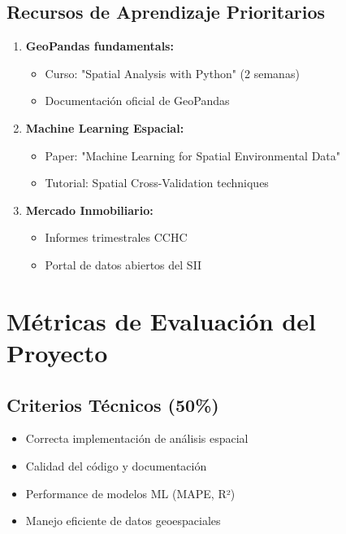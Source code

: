 \documentclass[12pt,a4paper]{article}
\begin{document}
\subsection{Recursos de Aprendizaje Prioritarios}

\begin{enumerate}
    \item \textbf{GeoPandas fundamentals:} 
    \begin{itemize}
        \item Curso: "Spatial Analysis with Python" (2 semanas)
        \item Documentación oficial de GeoPandas
    \end{itemize}
    
    \item \textbf{Machine Learning Espacial:}
    \begin{itemize}
        \item Paper: "Machine Learning for Spatial Environmental Data"
        \item Tutorial: Spatial Cross-Validation techniques
    \end{itemize}
    
    \item \textbf{Mercado Inmobiliario:}
    \begin{itemize}
        \item Informes trimestrales CCHC
        \item Portal de datos abiertos del SII
    \end{itemize}
\end{enumerate}

\section{Métricas de Evaluación del Proyecto}

\subsection{Criterios Técnicos (50\%)}

\begin{itemize}
    \item Correcta implementación de análisis espacial
    \item Calidad del código y documentación
    \item Performance de modelos ML (MAPE, R²)
    \item Manejo eficiente de datos geoespaciales
\end{itemize}
\end{document}
